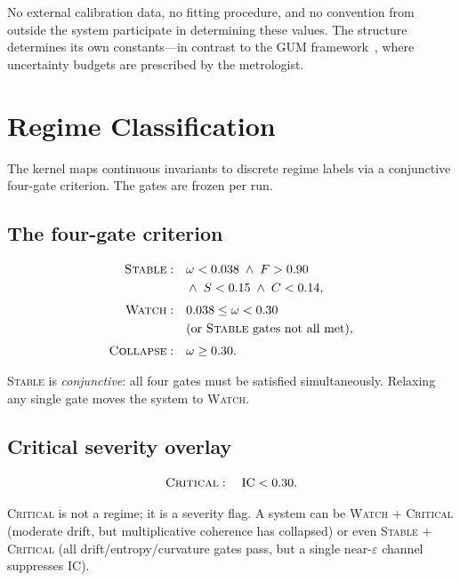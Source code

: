 \documentclass[
  aps,
  prd,
  twocolumn,
  superscriptaddress,
  nofootinbib,
  floatfix
]{revtex4-2}
\newcommand{\eps}{\varepsilon}
\newcommand{\beq}{\begin{equation}}
\newcommand{\eeq}{\end{equation}}
\newcommand{\regime}[1]{\textrm{\scshape#1}}
\newcommand{\IC}{\mathrm{IC}}
\begin{document}
No external calibration data, no fitting procedure, and no
convention from outside the system participate in determining
these values.  The structure determines its own constants---in
contrast to the GUM framework~\cite{jcgm2008gum}, where
uncertainty budgets are prescribed by the metrologist.


\section{Regime Classification}\label{sec:regime}

The kernel maps continuous invariants to discrete regime labels via
a conjunctive four-gate criterion.  The gates are frozen per run.

\subsection{The four-gate criterion}

\beq
\begin{aligned}
  \regime{Stable}: \quad &
    \omega < 0.038 \;\wedge\; F > 0.90 \\
    & \wedge\; S < 0.15 \;\wedge\; C < 0.14, \\[0.3em]
  \regime{Watch}: \quad &
    0.038 \leq \omega < 0.30 \\
    & \text{(or \regime{Stable} gates not all met)}, \\[0.3em]
  \regime{Collapse}: \quad &
    \omega \geq 0.30.
\end{aligned}
\eeq

\regime{Stable} is \emph{conjunctive}: all four gates must be
satisfied simultaneously.  Relaxing any single gate moves the
system to \regime{Watch}.

\subsection{Critical severity overlay}

\beq
  \regime{Critical}: \quad \IC < 0.30.
\eeq

\regime{Critical} is not a regime; it is a severity flag.  A system
can be \regime{Watch} + \regime{Critical} (moderate drift, but
multiplicative coherence has collapsed) or even \regime{Stable} +
\regime{Critical} (all drift/entropy/curvature gates pass, but a
single near-$\eps$ channel suppresses $\IC$).
\end{document}
